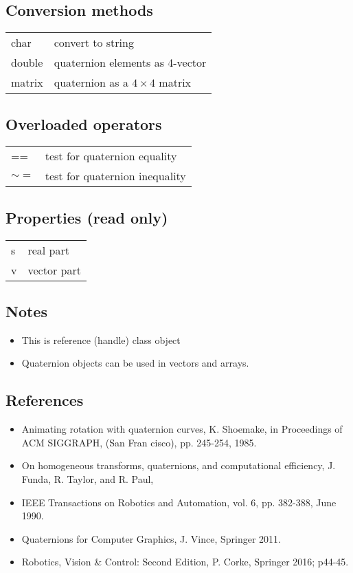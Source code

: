 \subsection*{Conversion methods}
\begin{longtable}{lp{120mm}}
char & convert to string\\ 
double & quaternion elements as 4-vector\\ 
matrix & quaternion as a $4 \times 4$ matrix\\ 
\end{longtable}\vspace{1ex}

\subsection*{Overloaded operators}
\begin{longtable}{lp{120mm}}
== & test for quaternion equality\\ 
$\sim=$ & test for quaternion inequality\\ 
\end{longtable}\vspace{1ex}

\subsection*{Properties (read only)}
\begin{longtable}{lp{120mm}}
s & real part\\ 
v & vector part\\ 
\end{longtable}\vspace{1ex}

\subsection*{Notes}
\begin{itemize}
  \item This is reference (handle) class object
  \item Quaternion objects can be used in vectors and arrays.
\end{itemize}

\subsection*{References}
\begin{itemize}
  \item Animating rotation with quaternion curves, K. Shoemake,    in Proceedings of ACM SIGGRAPH, (San Fran cisco), pp. 245-254, 1985.
  \item On homogeneous transforms, quaternions, and computational efficiency,    J. Funda, R. Taylor, and R. Paul,
  \item IEEE Transactions on Robotics and Automation, vol. 6, pp. 382-388, June 1990.
  \item Quaternions for Computer Graphics, J. Vince, Springer 2011.
  \item Robotics, Vision \& Control: Second Edition, P. Corke, Springer 2016; p44-45.
\end{itemize}

